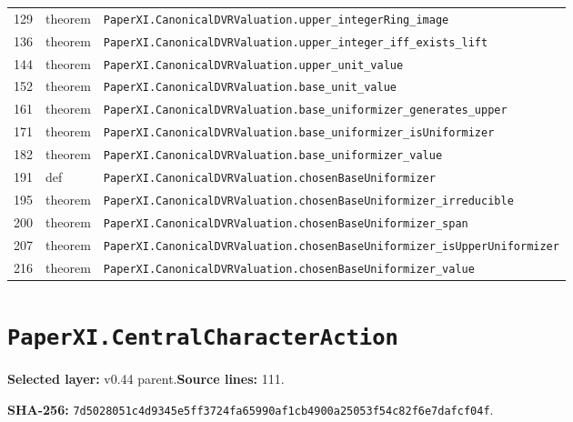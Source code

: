 \documentclass[10pt,oneside]{book}
\begin{document}
\begin{longtable}{@{}p{}p{}p{}@{}}
129&theorem&\nolinkurl{PaperXI.CanonicalDVRValuation.upper_integerRing_image}\\

136&theorem&\nolinkurl{PaperXI.CanonicalDVRValuation.upper_integer_iff_exists_lift}\\

144&theorem&\nolinkurl{PaperXI.CanonicalDVRValuation.upper_unit_value}\\

152&theorem&\nolinkurl{PaperXI.CanonicalDVRValuation.base_unit_value}\\

161&theorem&\nolinkurl{PaperXI.CanonicalDVRValuation.base_uniformizer_generates_upper}\\

171&theorem&\nolinkurl{PaperXI.CanonicalDVRValuation.base_uniformizer_isUniformizer}\\

182&theorem&\nolinkurl{PaperXI.CanonicalDVRValuation.base_uniformizer_value}\\

191&def&\nolinkurl{PaperXI.CanonicalDVRValuation.chosenBaseUniformizer}\\

195&theorem&\nolinkurl{PaperXI.CanonicalDVRValuation.chosenBaseUniformizer_irreducible}\\

200&theorem&\nolinkurl{PaperXI.CanonicalDVRValuation.chosenBaseUniformizer_span}\\

207&theorem&\nolinkurl{PaperXI.CanonicalDVRValuation.chosenBaseUniformizer_isUpperUniformizer}\\

216&theorem&\nolinkurl{PaperXI.CanonicalDVRValuation.chosenBaseUniformizer_value}\\

\bottomrule\end{longtable}

\section{\texorpdfstring{\nolinkurl{PaperXI.CentralCharacterAction}}{PaperXI.CentralCharacterAction}}\label{module:PaperXI.CentralCharacterAction}

\textbf{Selected layer:} v0.44 parent.\quad\textbf{Source lines:} 111.\par\textbf{SHA-256:} {\scriptsize\nolinkurl{7d5028051c4d9345e5ff3724fa65990af1cb4900a25053f54c82f6e7dafcf04f}}.
\end{document}
